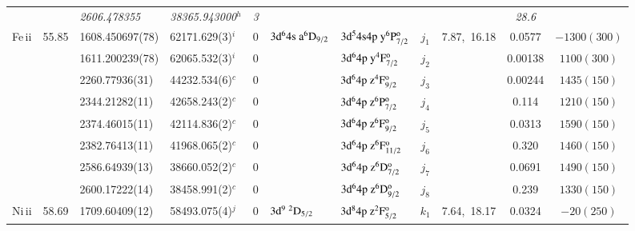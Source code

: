 \documentclass[useAMS,usenatbib]{mn2e}
\begin{document}
\begin{table*}
\begin{center}
\begin{minipage}{0.977\textwidth}
\begin{tabular}{lcllcllcccc}
              &        & \it{2606.478355}   & \it{38365.943000}$^h$    &\it{3}&                                            &                                                    &        &              &\it{28.6}& $          $\\
Fe{\sc \,ii}  & 55.85  & 1608.450697(78)    & 62171.629(3)$^i$         & 0    & $3\rm{d}^64\rm{s~a}^6\rm{D}_{9/2}$         & $3\rm{d}^54\rm{s}4\rm{p~y}^6\rm{P}_{7/2}^{\rm{o}}$ & $j_1$  & 7.87,~16.18  &  0.0577 & $-1300(300)$\\
              &        & 1611.200239(78)    & 62065.532(3)$^i$         & 0    &                                            & $3\rm{d}^64\rm{p~y}^4\rm{F}_{7/2}^{\rm{o}}$        & $j_2$  &              &  0.00138& $ 1100(300)$\\
              &        & 2260.77936(31)     & 44232.534(6)$^c$         & 0    &                                            & $3\rm{d}^64\rm{p~z}^4\rm{F}_{9/2}^{\rm{o}}$        & $j_3$  &              &  0.00244& $ 1435(150)$\\
              &        & 2344.21282(11)     & 42658.243(2)$^c$         & 0    &                                            & $3\rm{d}^64\rm{p~z}^6\rm{P}_{7/2}^{\rm{o}}$        & $j_4$  &              &  0.114  & $ 1210(150)$\\
              &        & 2374.46015(11)     & 42114.836(2)$^c$         & 0    &                                            & $3\rm{d}^64\rm{p~z}^6\rm{F}_{9/2}^{\rm{o}}$        & $j_5$  &              &  0.0313 & $ 1590(150)$\\
              &        & 2382.76413(11)     & 41968.065(2)$^c$         & 0    &                                            & $3\rm{d}^64\rm{p~z}^6\rm{F}_{11/2}^{\rm{o}}$       & $j_6$  &              &  0.320  & $ 1460(150)$\\
              &        & 2586.64939(13)     & 38660.052(2)$^c$         & 0    &                                            & $3\rm{d}^64\rm{p~z}^6\rm{D}_{7/2}^{\rm{o}}$        & $j_7$  &              &  0.0691 & $ 1490(150)$\\
              &        & 2600.17222(14)     & 38458.991(2)$^c$         & 0    &                                            & $3\rm{d}^64\rm{p~z}^6\rm{D}_{9/2}^{\rm{o}}$        & $j_8$  &              &  0.239  & $ 1330(150)$\\
Ni{\sc \,ii}  & 58.69  & 1709.60409(12)     & 58493.075(4)$^j$         & 0    & $3\rm{d}^9~^2\rm{D}_{5/2}$                 & $3\rm{d}^84\rm{p~z}^2\rm{F}_{5/2}^{\rm{o}}$        & $k_1$  & 7.64,~18.17  &  0.0324 & $  -20(250)$\\

\end{tabular}
\end{minipage}
\end{center}
\end{table*}
\end{document}
